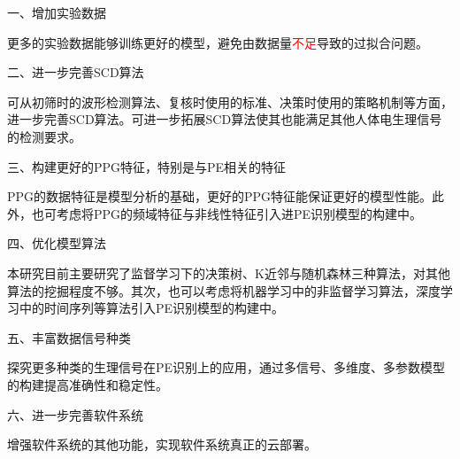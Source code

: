 一、增加实验数据

更多的实验数据能够训练更好的模型，避免由数据量\textcolor{red}{不足}导致的过拟合问题。

二、进一步完善SCD算法

可从初筛时的波形检测算法、复核时使用的标准、决策时使用的策略机制等方面，进一步完善SCD算法。可进一步拓展SCD算法使其也能满足其他人体电生理信号的检测要求。

三、构建更好的PPG特征，特别是与PE相关的特征

PPG的数据特征是模型分析的基础，更好的PPG特征能保证更好的模型性能。此外，也可考虑将PPG的频域特征与非线性特征引入进PE识别模型的构建中。

四、优化模型算法

本研究目前主要研究了监督学习下的决策树、K近邻与随机森林三种算法，对其他算法的挖掘程度不够。其次，也可以考虑将机器学习中的非监督学习算法，深度学习中的时间序列等算法引入PE识别模型的构建中。

五、丰富数据信号种类

探究更多种类的生理信号在PE识别上的应用，通过多信号、多维度、多参数模型的构建提高准确性和稳定性。

六、进一步完善软件系统

增强软件系统的其他功能，实现软件系统真正的云部署。
